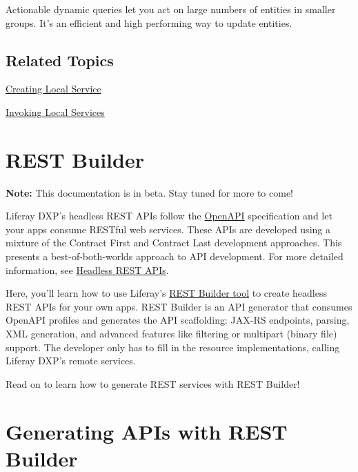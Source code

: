 Actionable dynamic queries let you act on large numbers of entities in
smaller groups. It's an efficient and high performing way to update
entities.

\section{Related Topics}\label{related-topics-25}

\href{/docs/7-2/appdev/-/knowledge_base/a/business-logic-with-service-builder}{Creating
Local Service}

\href{/docs/7-2/appdev/-/knowledge_base/a/invoking-local-services}{Invoking
Local Services}

\chapter{REST Builder}\label{rest-builder}

\noindent\hrulefill

\textbf{Note:} This documentation is in beta. Stay tuned for more to
come!

\noindent\hrulefill

Liferay DXP's headless REST APIs follow the
\href{https://swagger.io/docs/specification/about/}{OpenAPI}
specification and let your apps consume RESTful web services. These APIs
are developed using a mixture of the Contract First and Contract Last
development approaches. This presents a best-of-both-worlds approach to
API development. For more detailed information, see
\href{/docs/7-2/frameworks/-/knowledge_base/f/headless-rest-apis}{Headless
REST APIs}.

Here, you'll learn how to use Liferay's
\href{https://github.com/liferay/liferay-portal/tree/master/modules/util/portal-tools-rest-builder}{REST
Builder tool} to create headless REST APIs for your own apps. REST
Builder is an API generator that consumes OpenAPI profiles and generates
the API scaffolding: JAX-RS endpoints, parsing, XML generation, and
advanced features like filtering or multipart (binary file) support. The
developer only has to fill in the resource implementations, calling
Liferay DXP's remote services.

Read on to learn how to generate REST services with REST Builder!

\chapter{Generating APIs with REST
Builder}\label{generating-apis-with-rest-builder}

